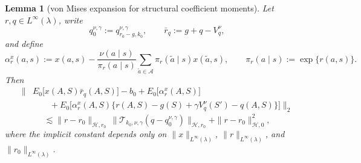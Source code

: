 \documentclass[11pt]{article}
\theoremstyle{plain}
\newtheorem{lemma}[theorem]{Lemma}
\begin{document}
\begin{lemma}[von Mises expansion for structural coefficient moments]
\label{lemma::vonmisescoefnorm}
Let \(r,q \in L^\infty(\lambda)\), write
\[
q_0^{\nu,\gamma} := q_{r_0-g,k_0}^{\nu,\gamma},
\qquad
\bar r_q := g + q - V_q^\nu,
\]
and define
\[
\alpha_r^x(a,s)
:=
x(a,s)
- \frac{\nu(a\mid s)}{\pi_r(a\mid s)}
\sum_{\tilde a \in \mathcal A}\pi_r(\tilde a\mid s)x(\tilde a,s),
\qquad
\pi_r(a\mid s):=\exp\{r(a,s)\}.
\]
Then
\[
\begin{aligned}
\Big\|
&E_0\!\big[x(A,S)\bar r_q(A,S)\big] - b_0
+ E_0\!\big[\alpha_r^x(A,S)\big] \\
&\qquad
+ E_0\!\big[\alpha_r^x(A,S)\{r(A,S)-g(S)+\gamma V_q^\nu(S')-q(A,S)\}\big]
\Big\|_2
\end{aligned}
\]
\[
\lesssim
\|r-r_0\|_{\mathcal H,r_0}\,
\bigl\|\mathcal T_{k_0,\nu,\gamma}(q-q_0^{\nu,\gamma})\bigr\|_{\mathcal H,r_0}
+ \|r-r_0\|_{\mathcal H,0}^2,
\]
where the implicit constant depends only on \(\|x\|_{L^\infty(\lambda)}\),
\(\|r\|_{L^\infty(\lambda)}\), and \(\|r_0\|_{L^\infty(\lambda)}\).
\end{lemma}
\end{document}
